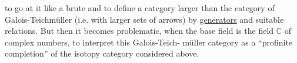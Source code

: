 to go at it like a brute and to define
a category larger than the category
of Galois-Teichmüller (i.e. with larger sets
of arrows) by \uline{generators}
and suitable relations. But then it
becomes problematic, when the base
field is the field $\mathbb C$ of complex numbers, to
interpret this Galois-Teich-
müller category as a ``profinite completion''
of the isotopy category considered
above.
